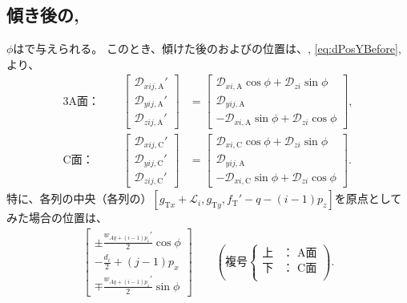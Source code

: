 \subsection{傾き後の\AfaceDimple, \CfaceDimple}
\DimpleAngle$\phi$はで与えられる。
このとき、傾けた後の\AFaceDimpleIRowJ および\CFaceDimpleIRowJ の位置は、, \eqref{eq:dPosYBefore}, より、
\begin{alignat*}{3}
  \text{A面：}&~~&
  \left[
  \begin{array}{c}
    \mathcal D_{xij,\mathrm A}'\\
    \mathcal D_{yij,\mathrm A}'\\
    \mathcal D_{zij,\mathrm A}'
  \end{array}
  \right]
 &= \left[
    \begin{array}{c}
      \mathcal D_{xi,\mathrm A}\cos\phi+\mathcal D_{zi}\sin\phi\\
      \mathcal D_{yij,\mathrm A}\\
      -\mathcal D_{xi,\mathrm A}\sin\phi+\mathcal D_{zi}\cos\phi
    \end{array}
    \right],\\[2pt]
  \text{C面：}&~~&
  \left[
  \begin{array}{c}
    \mathcal D_{xij,\mathrm C}'\\
    \mathcal D_{yij,\mathrm C}'\\
    \mathcal D_{zij,\mathrm C}'
  \end{array}
  \right]
 &= \left[
    \begin{array}{c}
      \mathcal D_{xi,\mathrm C}\cos\phi+\mathcal D_{zi}\sin\phi\\
      \mathcal D_{yij,\mathrm A}\\
      -\mathcal D_{xi,\mathrm C}\sin\phi+\mathcal D_{zi}\cos\phi
    \end{array}
    \right].
\end{alignat*}
特に、各列の中央（各列の\nameCurvatureCenter）$[g_{\mathrm Tx}+\mathcal L_i, g_{\mathrm Ty}, f_\mathrm T'-q-(i-1)p_z]$を原点としてみた場合の位置は、
\begin{align*}
  \left[
  \begin{array}{c}
    \displaystyle \pm\frac{w_{Aq+(i-1)p_z}'}2\cos\phi\\[6pt]
    \displaystyle -\frac{d_i}2+(j-1)p_x\\[6pt]
    \displaystyle \mp\frac{w_{Aq+(i-1)p_z}'}2\sin\phi
  \end{array}
  \right]\qquad
  \left(
  \text{複号}
  \left\{
  \begin{array}{rl}
    \!\text{上}\!\!\!\!& \text{： A面}\\
    \!\text{下}\!\!\!\!& \text{： C面}\\
  \end{array}
  \right.
  \right).
\end{align*}





